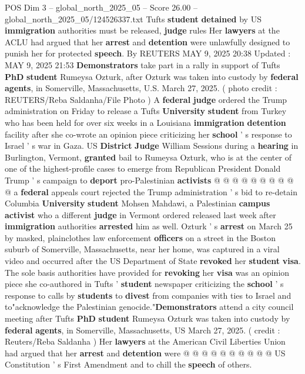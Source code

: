 \begin{textsample}{POS Dim 3 – global\_north\_2025\_05 – Score 26.00 – global\_north\_2025\_05/124526337.txt}  \label{ex:f3_pos_137}
Tufts \textbf{student} \textbf{detained} by US \textbf{immigration} authorities must be released, \textbf{judge} rules Her \textbf{lawyers} at the ACLU had argued that her \textbf{arrest} and \textbf{detention} were unlawfully designed to punish her for protected \textbf{speech}.
By REUTERS MAY 9, 2025 20:38 Updated : MAY 9, 2025 21:53 \textbf{Demonstrators} take part in a rally in support of Tufts \textbf{PhD} \textbf{student} Rumeysa Ozturk, after Ozturk was taken into custody by \textbf{federal} \textbf{agents}, in Somerville, Massachusetts, U.S.
March 27, 2025. ( photo credit : REUTERS/Reba Saldanha/File Photo ) A \textbf{federal} \textbf{judge} ordered the Trump administration on Friday to release a Tufts \textbf{University} \textbf{student} from Turkey who has been held for over six weeks in a Louisiana \textbf{immigration} \textbf{detention} facility after she co-wrote an opinion piece criticizing her \textbf{school} ' s response to Israel ' s war in Gaza.
US \textbf{District} \textbf{Judge} William Sessions during a \textbf{hearing} in Burlington, Vermont, \textbf{granted} bail to Rumeysa Ozturk, who is at the center of one of the highest-profile cases to emerge from Republican President Donald Trump ' s campaign to \textbf{deport} pro-Palestinian \textbf{activists} @ @ @ @ @ @ @ @ @ @ a \textbf{federal} appeals court rejected the Trump administration ' s bid to re-detain Columbia \textbf{University} \textbf{student} Mohsen Mahdawi, a Palestinian \textbf{campus} \textbf{activist} who a different \textbf{judge} in Vermont ordered released last week after \textbf{immigration} authorities \textbf{arrested} him as well.
Ozturk ' s \textbf{arrest} on March 25 by masked, plainclothes law enforcement \textbf{officers} on a street in the Boston suburb of Somerville, Massachusetts, near her home, was captured in a viral video and occurred after the US Department of State \textbf{revoked} her \textbf{student} \textbf{visa}.
The sole basis authorities have provided for \textbf{revoking} her \textbf{visa} was an opinion piece she co-authored in Tufts ' \textbf{student} newspaper criticizing the \textbf{school} ' s response to calls by \textbf{students} to \textbf{divest} from companies with ties to Israel and to"acknowledge the Palestinian genocide."\textbf{Demonstrators} attend a city council meeting after Tufts \textbf{PhD} \textbf{student} Rumeysa Ozturk was taken into custody by \textbf{federal} \textbf{agents}, in Somerville, Massachusetts, US March 27, 2025. ( credit : Reuters/Reba Saldanha ) Her \textbf{lawyers} at the American Civil Liberties Union had argued that her \textbf{arrest} and \textbf{detention} were @ @ @ @ @ @ @ @ @ @ US Constitution ' s First Amendment and to chill the \textbf{speech} of others.

\end{textsample}
